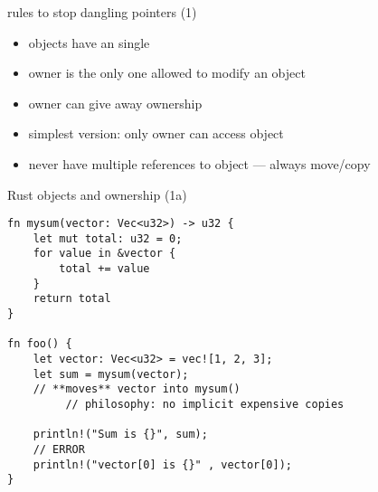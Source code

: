 \begin{frame}{rules to stop dangling pointers (1)}
    \begin{itemize}
    \item objects have an single 
    \item owner is the only one allowed to modify an object
    \item owner can give away ownership
    \item simplest version: only owner can access object
    \item never have multiple references to object --- always move/copy
    \end{itemize}
\end{frame}

\begin{frame}[fragile,label=rustOwnership1]{Rust objects and ownership (1a)}
    \begin{verbatim}
fn mysum(vector: Vec<u32>) -> u32 {
    let mut total: u32 = 0;
    for value in &vector {
        total += value
    }
    return total
}

fn foo() {
    let vector: Vec<u32> = vec![1, 2, 3];
    let sum = mysum(vector);
    // **moves** vector into mysum()
         // philosophy: no implicit expensive copies
    
    println!("Sum is {}", sum);
    // ERROR
    println!("vector[0] is {}" , vector[0]);
}
\end{verbatim}
\end{frame}

